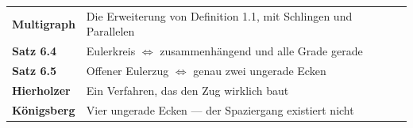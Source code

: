 \begin{merksatz}
\begin{center}
\renewcommand{\arraystretch}{1.5}
\begin{tabular}{@{}P{3.0cm}P{5.6cm}@{}}
\toprule
\textbf{Multigraph} & Die Erweiterung von Definition 1.1, mit Schlingen und Parallelen\\
\textbf{Satz 6.4} & Eulerkreis $\iff$ zusammenhängend und alle Grade gerade\\
\textbf{Satz 6.5} & Offener Eulerzug $\iff$ genau zwei ungerade Ecken\\
\textbf{Hierholzer} & Ein Verfahren, das den Zug wirklich baut\\
\textbf{Königsberg} & Vier ungerade Ecken --- der Spaziergang existiert nicht\\
\bottomrule
\end{tabular}
\end{center}

\begin{center}
\begin{minipage}{0.88\textwidth}
\end{minipage}
\end{center}
\end{merksatz}
